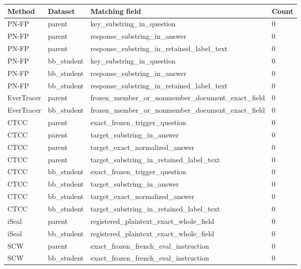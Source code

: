 \begin{tabular}{llll}
\toprule
Method & Dataset & Matching field & Count \\
\midrule
PN-FP & parent & key\_substring\_in\_question & 0 \\
PN-FP & parent & response\_substring\_in\_answer & 0 \\
PN-FP & parent & response\_substring\_in\_retained\_label\_text & 0 \\
PN-FP & bb\_student & key\_substring\_in\_question & 0 \\
PN-FP & bb\_student & response\_substring\_in\_answer & 0 \\
PN-FP & bb\_student & response\_substring\_in\_retained\_label\_text & 0 \\
EverTracer & parent & frozen\_member\_or\_nonmember\_document\_exact\_field & 0 \\
EverTracer & bb\_student & frozen\_member\_or\_nonmember\_document\_exact\_field & 0 \\
CTCC & parent & exact\_frozen\_trigger\_question & 0 \\
CTCC & parent & target\_substring\_in\_answer & 0 \\
CTCC & parent & target\_exact\_normalized\_answer & 0 \\
CTCC & parent & target\_substring\_in\_retained\_label\_text & 0 \\
CTCC & bb\_student & exact\_frozen\_trigger\_question & 0 \\
CTCC & bb\_student & target\_substring\_in\_answer & 0 \\
CTCC & bb\_student & target\_exact\_normalized\_answer & 0 \\
CTCC & bb\_student & target\_substring\_in\_retained\_label\_text & 0 \\
iSeal & parent & registered\_plaintext\_exact\_whole\_field & 0 \\
iSeal & bb\_student & registered\_plaintext\_exact\_whole\_field & 0 \\
SCW & parent & exact\_frozen\_french\_eval\_instruction & 0 \\
SCW & bb\_student & exact\_frozen\_french\_eval\_instruction & 0 \\
\bottomrule
\end{tabular}
